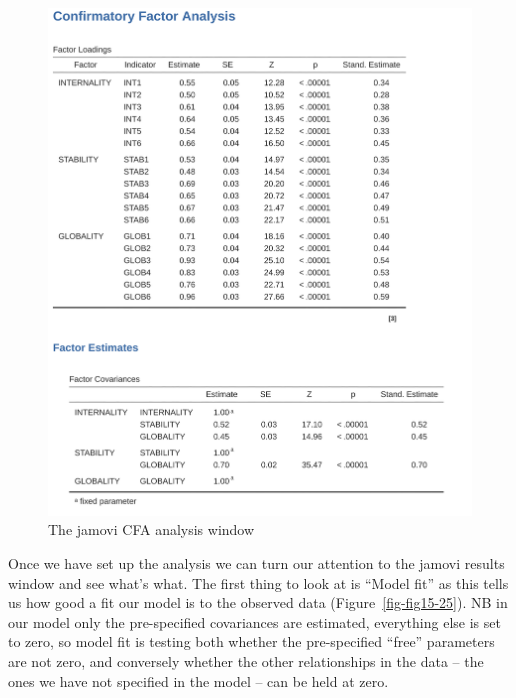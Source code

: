 \documentclass[
  a4paper,
]{book}
\begin{document}
\begin{figure}

\includegraphics[width=1\textwidth,height=\textheight]{images/fig15-24.png} \hfill{}

\caption{\label{fig-fig15-24}The jamovi CFA analysis window}

\end{figure}

Once we have set up the analysis we can turn our attention to the jamovi
results window and see what's what. The first thing to look at is
``Model fit'' as this tells us how good a fit our model is to the
observed data (Figure~\ref{fig-fig15-25}). NB in our model only the
pre-specified covariances are estimated, everything else is set to zero,
so model fit is testing both whether the pre-specified ``free''
parameters are not zero, and conversely whether the other relationships
in the data -- the ones we have not specified in the model -- can be
held at zero.
\end{document}

